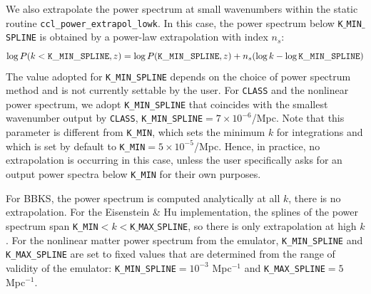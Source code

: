 \documentclass[\docopts]{\docclass}
\begin{document}
We also extrapolate the power spectrum at small wavenumbers within the static routine {\tt ccl\_power\_extrapol\_lowk}. In this case, the power spectrum below {\tt K$\_$MIN$\_$SPLINE} is obtained by a power-law extrapolation with index $n_s$:
\begin{equation}
  \log P(k<{\tt K\_MIN\_SPLINE},z) = \log P({\tt K\_MIN\_SPLINE},z) + n_s (\log k-\log{\tt K\_MIN\_SPLINE})
\end{equation}
The value adopted for {\tt K\_MIN\_SPLINE} depends on the choice of power spectrum method and is not currently settable by the user. For {\tt CLASS} and the nonlinear power spectrum, we adopt {\tt K\_MIN\_SPLINE} that coincides with the smallest wavenumber output by {\tt CLASS}, {\tt K\_MIN\_SPLINE}$=7\times 10^{-6}$/Mpc.  Note that this parameter is different from {\tt K\_MIN}, which sets the minimum $k$ for integrations and which is set by default to {\tt K\_MIN}$=5\times 10^{-5}$/Mpc. Hence, in practice, no extrapolation is occurring in this case, unless the user specifically asks for an output power spectra below {\tt K\_MIN} for their own purposes.

For BBKS, the power spectrum is computed analytically at all $k$, there is no extrapolation. For the Eisenstein \& Hu implementation, the splines of the power spectrum span {\tt K\_MIN}$<k<${\tt K$\_$MAX$\_$SPLINE}, so there is only extrapolation at high $k$. For the nonlinear matter power spectrum from the emulator, {\tt K\_MIN\_SPLINE} and {\tt K\_MAX\_SPLINE} are set to fixed values that are determined from the range of validity of the emulator:  {\tt K\_MIN\_SPLINE}$=10^{-3}$ Mpc$^{-1}$ and {\tt K\_MAX\_SPLINE}$=5$ Mpc$^{-1}$.
\end{document}
